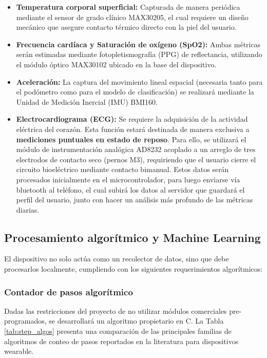 \documentclass[letterpaper,11pt]{article}
\newcommand{\rtabla}[1]{Tabla \ref{#1}}
\begin{document}
\begin{itemize}
    \item \textbf{Temperatura corporal superficial:} Capturada de manera periódica mediante el sensor de grado clínico MAX30205, el cual requiere un diseño mecánico que asegure contacto térmico directo con la piel del usuario.
    \item \textbf{Frecuencia cardíaca y Saturación de oxígeno (SpO2):} Ambas métricas serán estimadas mediante fotopletismografía (PPG) de reflectancia, utilizando el módulo óptico MAX30102 ubicado en la base del dispositivo.
    \item \textbf{Aceleración:} La captura del movimiento lineal espacial (necesaria tanto para el podómetro como para el modelo de clasificación) se realizará mediante la Unidad de Medición Inercial (IMU) BMI160.
    \item \textbf{Electrocardiograma (ECG):} Se requiere la adquisición de la actividad eléctrica del corazón. Esta función estará destinada de manera exclusiva a \textbf{mediciones puntuales en estado de reposo}. Para ello, se utilizará el módulo de instrumentación analógica AD8232 acoplado a un arreglo de tres electrodos de contacto seco (pernos M3), requiriendo que el usuario cierre el circuito bioeléctrico mediante contacto bimanual. Estos datos serán procesados inicialmente en el microcontrolador, para luego enviarse vía bluetooth al teléfono, el cual subirá los datos al servidor que guardará el perfil del usuario, junto con hacer un análisis más profundo de las métricas diarias.
\end{itemize}

\subsection{Procesamiento algorítmico y Machine Learning}
El dispositivo no solo actúa como un recolector de datos, sino que debe procesarlos localmente, cumpliendo con los siguientes requerimientos algorítmicos:

\subsubsection{Contador de pasos algorítmico}

Dadas las restricciones del proyecto de no utilizar módulos comerciales pre-programados, se desarrollará un algoritmo propietario en C. La \rtabla{tab:step_algos} presenta una comparación de las principales familias de algoritmos de conteo de pasos reportados en la literatura para dispositivos wearable.
\end{document}
